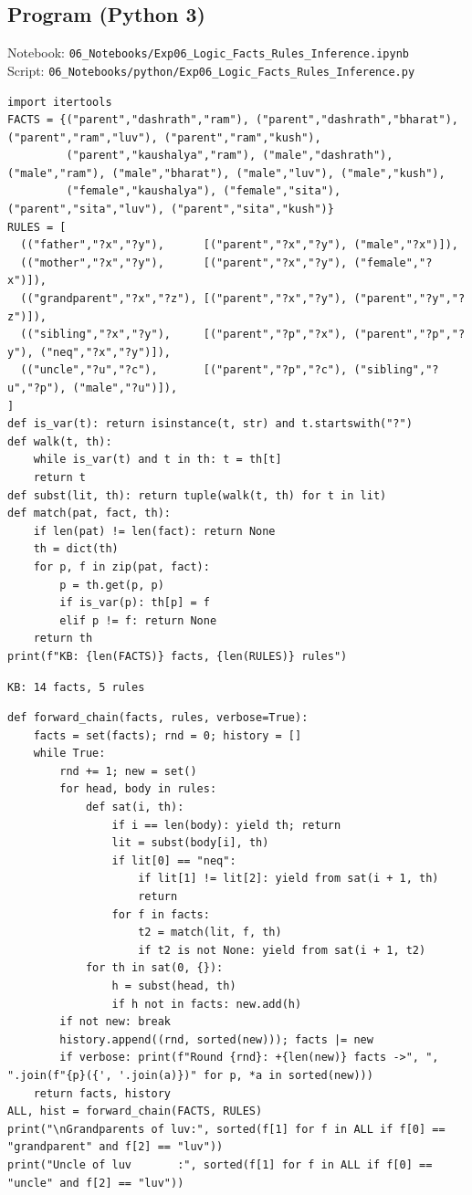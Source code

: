 \documentclass[11pt]{article}
\begin{document}
\subsection*{Program (Python 3)}
{\small\color{slate}Notebook: \texttt{06\_Notebooks/Exp06\_Logic\_Facts\_Rules\_Inference.ipynb}\\ Script: \texttt{06\_Notebooks/python/Exp06\_Logic\_Facts\_Rules\_Inference.py}}
\begin{lstlisting}[style=py]
import itertools
FACTS = {("parent","dashrath","ram"), ("parent","dashrath","bharat"), ("parent","ram","luv"), ("parent","ram","kush"),
         ("parent","kaushalya","ram"), ("male","dashrath"), ("male","ram"), ("male","bharat"), ("male","luv"), ("male","kush"),
         ("female","kaushalya"), ("female","sita"), ("parent","sita","luv"), ("parent","sita","kush")}
RULES = [
  (("father","?x","?y"),      [("parent","?x","?y"), ("male","?x")]),
  (("mother","?x","?y"),      [("parent","?x","?y"), ("female","?x")]),
  (("grandparent","?x","?z"), [("parent","?x","?y"), ("parent","?y","?z")]),
  (("sibling","?x","?y"),     [("parent","?p","?x"), ("parent","?p","?y"), ("neq","?x","?y")]),
  (("uncle","?u","?c"),       [("parent","?p","?c"), ("sibling","?u","?p"), ("male","?u")]),
]
def is_var(t): return isinstance(t, str) and t.startswith("?")
def walk(t, th):
    while is_var(t) and t in th: t = th[t]
    return t
def subst(lit, th): return tuple(walk(t, th) for t in lit)
def match(pat, fact, th):
    if len(pat) != len(fact): return None
    th = dict(th)
    for p, f in zip(pat, fact):
        p = th.get(p, p)
        if is_var(p): th[p] = f
        elif p != f: return None
    return th
print(f"KB: {len(FACTS)} facts, {len(RULES)} rules")
\end{lstlisting}
\begin{lstlisting}[style=out]
KB: 14 facts, 5 rules
\end{lstlisting}
\begin{lstlisting}[style=py]
def forward_chain(facts, rules, verbose=True):
    facts = set(facts); rnd = 0; history = []
    while True:
        rnd += 1; new = set()
        for head, body in rules:
            def sat(i, th):
                if i == len(body): yield th; return
                lit = subst(body[i], th)
                if lit[0] == "neq":
                    if lit[1] != lit[2]: yield from sat(i + 1, th)
                    return
                for f in facts:
                    t2 = match(lit, f, th)
                    if t2 is not None: yield from sat(i + 1, t2)
            for th in sat(0, {}):
                h = subst(head, th)
                if h not in facts: new.add(h)
        if not new: break
        history.append((rnd, sorted(new))); facts |= new
        if verbose: print(f"Round {rnd}: +{len(new)} facts ->", ", ".join(f"{p}({', '.join(a)})" for p, *a in sorted(new)))
    return facts, history
ALL, hist = forward_chain(FACTS, RULES)
print("\nGrandparents of luv:", sorted(f[1] for f in ALL if f[0] == "grandparent" and f[2] == "luv"))
print("Uncle of luv       :", sorted(f[1] for f in ALL if f[0] == "uncle" and f[2] == "luv"))
\end{lstlisting}
\end{document}
